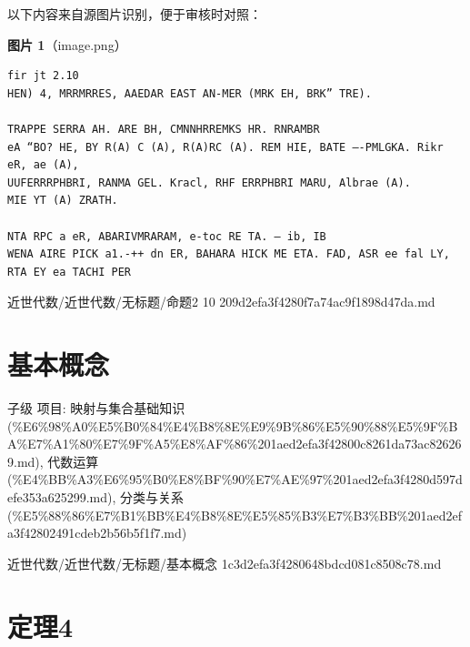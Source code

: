 \begin{note}
以下内容来自源图片识别，便于审核时对照：

\textbf{图片 1}（image.png）
\begin{Verbatim}[fontsize=\small]
fir jt 2.10
HEN) 4, MRRMRRES, AAEDAR EAST AN-MER (MRK EH, BRK” TRE).

TRAPPE SERRA AH. ARE BH, CMNNHRREMKS HR. RNRAMBR
eA “BO? HE, BY R(A) C (A), R(A)RC (A). REM HIE, BATE —-PMLGKA. Rikr eR, ae (A),
UUFERRRPHBRI, RANMA GEL. Kracl, RHF ERRPHBRI MARU, Albrae (A).
MIE YT (A) ZRATH.

NTA RPC a eR, ABARIVMRARAM, e-toc RE TA. — ib, IB
WENA AIRE PICK a1.-++ dn ER, BAHARA HICK ME ETA. FAD, ASR ee fal LY,
RTA EY ea TACHI PER
\end{Verbatim}

\end{note}

\begin{note}[来源路径]

近世代数/近世代数/无标题/命题2 10 209d2efa3f4280f7a74ac9f1898d47da.md

\end{note}

\section*{基本概念}

\begin{note}[基本概念]

子级 项目: 映射与集合基础知识 (\%E6\%98\%A0\%E5\%B0\%84\%E4\%B8\%8E\%E9\%9B\%86\%E5\%90\%88\%E5\%9F\%BA\%E7\%A1\%80\%E7\%9F\%A5\%E8\%AF\%86\%201aed2efa3f42800c8261da73ac826269.md), 代数运算 (\%E4\%BB\%A3\%E6\%95\%B0\%E8\%BF\%90\%E7\%AE\%97\%201aed2efa3f4280d597defe353a625299.md), 分类与关系 (\%E5\%88\%86\%E7\%B1\%BB\%E4\%B8\%8E\%E5\%85\%B3\%E7\%B3\%BB\%201aed2efa3f42802491cdeb2b56b5f1f7.md)

\end{note}

\begin{note}[来源路径]

近世代数/近世代数/无标题/基本概念 1c3d2efa3f4280648bdcd081c8508c78.md

\end{note}

\section*{定理4}

